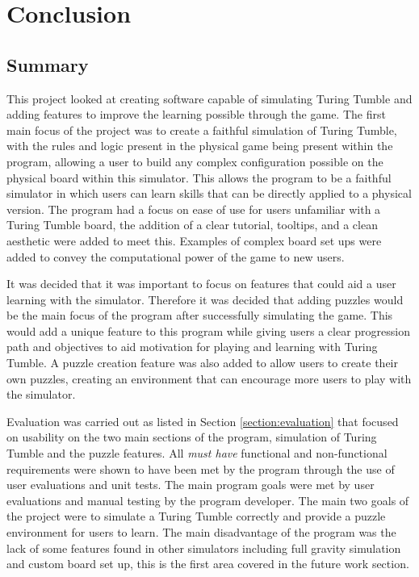 \documentclass{l4proj}
\begin{document}



\chapter{Conclusion}
\section{Summary}
This project looked at creating software capable of simulating Turing Tumble and adding features to improve the learning possible through the game. The first main focus of the project was to create a faithful simulation of Turing Tumble, with the rules and logic present in the physical game being present within the program, allowing a user to build any complex configuration possible on the physical board within this simulator. This allows the program to be a faithful simulator in which users can learn skills that can be directly applied to a physical version. The program had a focus on ease of use for users unfamiliar with a Turing Tumble board, the addition of a clear tutorial, tooltips, and a clean aesthetic were added to meet this. Examples of complex board set ups were added to convey the computational power of the game to new users. 

It was decided that it was important to focus on features that could aid a user learning with the simulator. Therefore it was decided that adding puzzles would be the main focus of the program after successfully simulating the game. This would add a unique feature to this program while giving users a clear progression path and objectives to aid motivation for playing and learning with Turing Tumble. A puzzle creation feature was also added to allow users to create their own puzzles, creating an environment that can encourage more users to play with the simulator. 

Evaluation was carried out as listed in Section \ref{section:evaluation} that focused on usability on the two main sections of the program, simulation of  Turing Tumble and the puzzle features. All \emph{must have} functional and non-functional requirements were shown to have been met by the program through the use of user evaluations and unit tests. The main program goals were met by user evaluations and manual testing by the program developer. The main two goals of the project were to simulate a Turing Tumble correctly and provide a puzzle environment for users to learn. The main disadvantage of the program was the lack of some features found in other simulators including full gravity simulation and custom board set up, this is the first area covered in the future work section.
\end{document}
